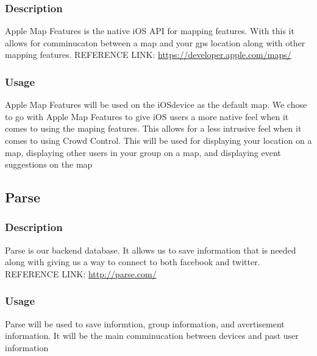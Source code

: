 	\subsubsection{Description}
	Apple Map Features is the native iOS API for mapping features. With this it allows for comminucaton between a map and your gps location along with other mapping features.
\newline
REFERENCE LINK: \url{https://developer.apple.com/maps/}
	\subsubsection{Usage}
Apple Map Features will be used on the iOSdevice as the default map. We chose to go with Apple Map Features to give iOS users a more native feel when it comes to using the maping features. This allows for a less intrusive feel when it comes to using Crowd Control. This will be used for displaying your location on a map, displaying other users in your group on a map, and displaying event suggestions on the map

\subsection{Parse}
	\subsubsection{Description}
	Parse is our backend database. It allows us to save information that is needed along with giving us a way to connect to both facebook and twitter.
\newline
REFERENCE LINK: \url{http://parse.com/}
	\subsubsection{Usage}
	Parse will be used to save informtion, group information, and avertisement information. It will be the main comminucation between devices and past user information




